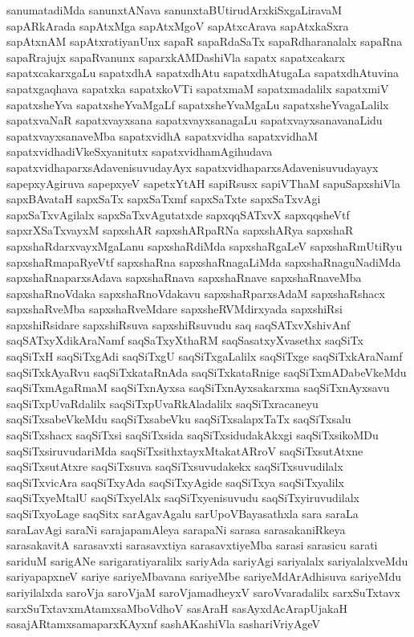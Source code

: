 {sanumatadiMda
sanunxtANava
sanunxtaBUtirudArxkiSxgaLiravaM
sapARkArada
sapAtxMga
sapAtxMgoV
sapAtxcArava
sapAtxkaSxra
sapAtxnAM
sapAtxratiyanUnx
sapaR
sapaRdaSaTx
sapaRdharanalalx
sapaRna
sapaRrajujx
sapaRvanunx
saparxkAMDashiVla
sapatx
sapatxcakarx
sapatxcakarxgaLu
sapatxdhA
sapatxdhAtu
sapatxdhAtugaLa
sapatxdhAtuvina
sapatxgaqhava
sapatxka
sapatxkoVTi
sapatxmaM
sapatxmadalilx
sapatxmiV
sapatxsheYva
sapatxsheYvaMgaLf
sapatxsheYvaMgaLu
sapatxsheYvagaLalilx
sapatxvaNaR
sapatxvayxsana
sapatxvayxsanagaLu
sapatxvayxsanavanaLidu
sapatxvayxsanaveMba
sapatxvidhA
sapatxvidha
sapatxvidhaM
sapatxvidhadiVkeSxyanitutx
sapatxvidhamAgihudava
sapatxvidhaparxsAdavenisuvudayAyx
sapatxvidhaparxsAdavenisuvudayayx
sapepxyAgiruva
sapepxyeV
sapetxYtAH
sapiRsusx
sapiVThaM
sapuSapxshiVla
sapxBAvataH
sapxSaTx
sapxSaTxmf
sapxSaTxte
sapxSaTxvAgi
sapxSaTxvAgilalx
sapxSaTxvAgutatxde
sapxqqSATxvX
sapxqqsheVtf
sapxrXSaTxvayxM
sapxshAR
sapxshARpaRNa
sapxshARya
sapxshaR
sapxshaRdarxvayxMgaLanu
sapxshaRdiMda
sapxshaRgaLeV
sapxshaRmUtiRyu
sapxshaRmapaRyeVtf
sapxshaRna
sapxshaRnagaLiMda
sapxshaRnaguNadiMda
sapxshaRnaparxsAdava
sapxshaRnava
sapxshaRnave
sapxshaRnaveMba
sapxshaRnoVdaka
sapxshaRnoVdakavu
sapxshaRparxsAdaM
sapxshaRshacx
sapxshaRveMba
sapxshaRveMdare
sapxsheRVMdirxyada
sapxshiRsi
sapxshiRsidare
sapxshiRsuva
sapxshiRsuvudu
saq
saqSATxvXshivAnf
saqSATxyXdikAraNamf
saqSaTxyXthaRM
saqSasatxyXvasethx
saqSiTx
saqSiTxH
saqSiTxgAdi
saqSiTxgU
saqSiTxgaLalilx
saqSiTxge
saqSiTxkAraNamf
saqSiTxkAyaRvu
saqSiTxkataRnAda
saqSiTxkataRnige
saqSiTxmADabeVkeMdu
saqSiTxmAgaRmaM
saqSiTxnAyxsa
saqSiTxnAyxsakarxma
saqSiTxnAyxsavu
saqSiTxpUvaRdalilx
saqSiTxpUvaRkAladalilx
saqSiTxracaneyu
saqSiTxsabeVkeMdu
saqSiTxsabeVku
saqSiTxsalapxTaTx
saqSiTxsalu
saqSiTxshacx
saqSiTxsi
saqSiTxsida
saqSiTxsidudakAkxgi
saqSiTxsikoMDu
saqSiTxsiruvudariMda
saqSiTxsithxtayxMtakatARroV
saqSiTxsutAtxne
saqSiTxsutAtxre
saqSiTxsuva
saqSiTxsuvudakekx
saqSiTxsuvudilalx
saqSiTxvicAra
saqSiTxyAda
saqSiTxyAgide
saqSiTxya
saqSiTxyalilx
saqSiTxyeMtalU
saqSiTxyelAlx
saqSiTxyenisuvudu
saqSiTxyiruvudilalx
saqSiTxyoLage
saqSitx
sarAgavAgalu
sarUpoVBayasathxla
sara
saraLa
saraLavAgi
saraNi
sarajapamAleya
sarapaNi
sarasa
sarasakaniRkeya
sarasakavitA
sarasavxti
sarasavxtiya
sarasavxtiyeMba
sarasi
sarasicu
sarati
sariduM
sarigANe
sarigaratiyaralilx
sariyAda
sariyAgi
sariyalalx
sariyalalxveMdu
sariyapapxneV
sariye
sariyeMbavana
sariyeMbe
sariyeMdArAdhisuva
sariyeMdu
sariyilalxda
saroVja
saroVjaM
saroVjamadheyxV
saroVvaradalilx
sarxSuTxtavx
sarxSuTxtavxmAtamxsaMboVdhoV
sasAraH
sasAyxdAcArapUjakaH
sasajARtamxsamaparxKAyxnf
sashAKashiVla
sashariVriyAgeV
}
